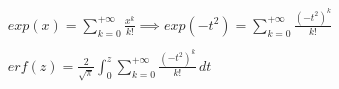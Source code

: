 \documentclass[preview]{standalone}
\begin{document}
\begin{align*}
exp(x) = \sum_{k=0}^{+\infty} { \frac{x^k}{k!} }\implies exp(-t^2) = \sum_{k=0}^{+\infty} { \frac{(-t^2)^k}{k!} }\\ \\ erf(z) = { \frac{2}{\sqrt{\pi}} } \int_0^z { \sum_{k=0}^{+\infty} { \frac{(-t^2)^k}{k!} } } \, dt
\end{align*}
\end{document}
